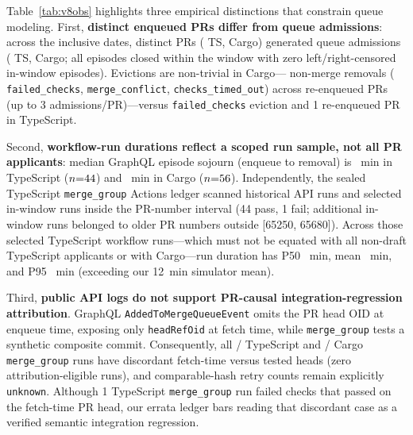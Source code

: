 

Table~\ref{tab:v8obs} highlights three empirical distinctions that constrain queue modeling. First, \textbf{distinct enqueued PRs differ from queue admissions}: across the \ObsDays{} inclusive dates, \ObsDistinctPrs{} distinct PRs (\ObsTsPrs{} TS, \ObsCargoPrs{} Cargo) generated \ObsAdmissions{} queue admissions (\ObsTsAdmissions{} TS, \ObsCargoAdmissions{} Cargo; all \ObsAdmissions{} episodes closed within the window with zero left/right-censored in-window episodes). Evictions are non-trivial in Cargo---\ObsCargoEvictions{} non-merge removals (\ObsCargoFailedChecks{} \texttt{failed\_checks}, \ObsCargoConflicts{} \texttt{merge\_conflict}, \ObsCargoTimeouts{} \texttt{checks\_timed\_out}) across \ObsCargoMultiPrs{} re-enqueued PRs (up to 3 admissions/PR)---versus \ObsTsFailedChecks{} \texttt{failed\_checks} eviction and 1 re-enqueued PR in TypeScript.

Second, \textbf{workflow-run durations reflect a scoped run sample, not all PR applicants}: median GraphQL episode sojourn (enqueue to removal) is \ObsTsSojournP{}~min in TypeScript ($n{=}44{}$) and \ObsCargoSojournP{}~min in Cargo ($n{=}56{}$). Independently, the sealed TypeScript \texttt{merge\_group} Actions ledger scanned \ObsTsWfScanned{} historical API runs and selected \ObsTsWfSelected{} in-window runs inside the PR-number interval (44 pass, 1 fail; \ObsTsWfCaveats{} additional in-window runs belonged to older PR numbers outside [65250, 65680]). Across those \ObsTsWfSelected{} selected TypeScript workflow runs---which must not be equated with all \ObsTsFetched{} non-draft TypeScript applicants or with Cargo---run duration has P50 \ObsTsWfP{}~min, mean \ObsTsWfMean{}~min, and P95 \ObsTsWfPnf{}~min (exceeding our 12~min simulator mean).

Third, \textbf{public API logs do not support PR-causal integration-regression attribution}. GraphQL \texttt{AddedToMergeQueueEvent} omits the PR head OID at enqueue time, exposing only \texttt{headRefOid} at fetch time, while \texttt{merge\_group} tests a synthetic composite commit. Consequently, all \ObsTsWfDiscordant{}/\ObsTsWfSelected{} TypeScript and \ObsCargoDiscordant{}/\ObsCargoDiscordant{} Cargo \texttt{merge\_group} runs have discordant fetch-time versus tested heads (zero attribution-eligible runs), and comparable-hash retry counts remain explicitly \texttt{unknown}. Although 1 TypeScript \texttt{merge\_group} run failed checks that passed on the fetch-time PR head, our errata ledger bars reading that discordant case as a verified semantic integration regression.
